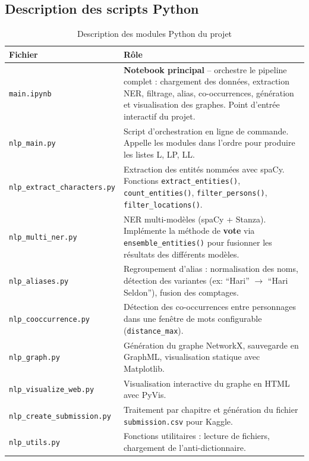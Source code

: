 \documentclass[12pt,a4paper]{article}
\begin{document}
\subsection{Description des scripts Python}

\begin{table}[h!]
\centering
\small
\begin{tabular}{@{}p{4.5cm}p{10cm}@{}}
\toprule
\textbf{Fichier} & \textbf{Rôle} \\
\midrule
\texttt{main.ipynb} & \textbf{Notebook principal} -- orchestre le pipeline complet : chargement des données, extraction NER, filtrage, alias, co-occurrences, génération et visualisation des graphes. Point d'entrée interactif du projet. \\
\addlinespace
\texttt{nlp\_main.py} & Script d'orchestration en ligne de commande. Appelle les modules dans l'ordre pour produire les listes L, LP, LL. \\
\addlinespace
\texttt{nlp\_extract\_characters.py} & Extraction des entités nommées avec spaCy. Fonctions \texttt{extract\_entities()}, \texttt{count\_entities()}, \texttt{filter\_persons()}, \texttt{filter\_locations()}. \\
\addlinespace
\texttt{nlp\_multi\_ner.py} & NER multi-modèles (spaCy + Stanza). Implémente la méthode de \textbf{vote} via \texttt{ensemble\_entities()} pour fusionner les résultats des différents modèles. \\
\addlinespace
\texttt{nlp\_aliases.py} & Regroupement d'alias : normalisation des noms, détection des variantes (ex: ``Hari'' $\rightarrow$ ``Hari Seldon''), fusion des comptages. \\
\addlinespace
\texttt{nlp\_cooccurrence.py} & Détection des co-occurrences entre personnages dans une fenêtre de mots configurable (\texttt{distance\_max}). \\
\addlinespace
\texttt{nlp\_graph.py} & Génération du graphe NetworkX, sauvegarde en GraphML, visualisation statique avec Matplotlib. \\
\addlinespace
\texttt{nlp\_visualize\_web.py} & Visualisation interactive du graphe en HTML avec PyVis. \\
\addlinespace
\texttt{nlp\_create\_submission.py} & Traitement par chapitre et génération du fichier \texttt{submission.csv} pour Kaggle. \\
\addlinespace
\texttt{nlp\_utils.py} & Fonctions utilitaires : lecture de fichiers, chargement de l'anti-dictionnaire. \\
\bottomrule
\end{tabular}
\caption{Description des modules Python du projet}
\end{table}
\end{document}
